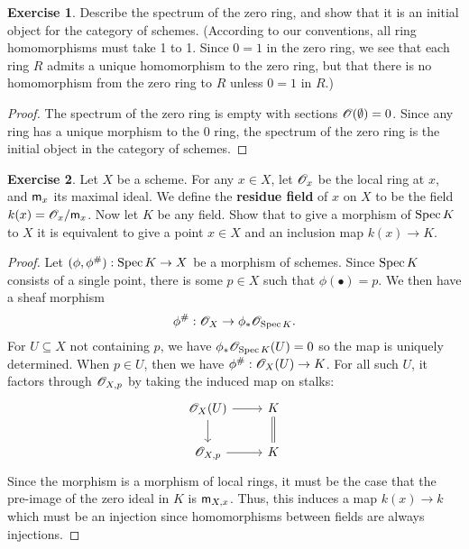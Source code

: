 \documentclass[]{pcmi}
\theoremstyle{plain}
\theoremstyle{definition}
\newtheorem{Exercise}{Exercise}
\theoremstyle{remark}
\begin{document}
\begin{Exercise}
    Describe the spectrum of the zero ring, and show that it is an initial object for the category of schemes. (According to our conventions, all ring homomorphisms must take 1 to 1. Since $0 = 1$ in the zero ring, we see that each ring $R$ admits a unique homomorphism to the zero ring, but that there is no homomorphism from the zero ring to $R$ unless $0 = 1$ in $R$.)
\end{Exercise}

\begin{proof}
    The spectrum of the zero ring is empty with sections $\mathscr{O}(\emptyset) = 0$. Since any ring has a unique morphism to the $0$ ring, the spectrum of the zero ring is the initial object in the category of schemes. 
\end{proof}

\begin{Exercise}
    Let $X$ be a scheme. For any $x \in X$, let $\mathscr{O}_x$ be the local ring at $x$, and $\mathsf{m}_x$ its maximal ideal. We define the \textbf{residue field} of $x$ on $X$ to be the field $k(x) = \mathscr{O}_x / \mathsf{m}_x$. Now let $K$ be any field. Show that to give a morphism of $\operatorname{Spec} K$ to $X$ it is equivalent to give a point $x \in X$ and an inclusion map $k(x) \to K$. 
\end{Exercise}

\begin{proof}
    Let $(\phi, \phi^{\#}): \operatorname{Spec} K \to X$ be a morphism of schemes. Since $\operatorname{Spec} K$ consists of a single point, there is some $p \in X$ such that $\phi(\bullet) = p$. We then have a sheaf morphism 
    \[
        \phi^{\#} : \mathscr{O}_X \to \phi_* \mathscr{O}_{\operatorname{Spec} K}. 
    \]
    For $U \subseteq X$ not containing $p$, we have $\phi_* \mathscr{O}_{\operatorname{Spec} K}(U) = 0$ so the map is uniquely determined. When $p \in U$, then we have $\phi^{\#} : \mathscr{O}_X(U) \to K$. For all such $U$, it factors through $\mathscr{O}_{X, p}$ by taking the induced map on stalks:
    \[
        \begin{tikzcd}
            {\mathscr{O}_X(U)} & K \\
            {\mathscr{O}_{X, p}} & K
            \arrow[from=1-1, to=1-2]
            \arrow[from=1-1, to=2-1]
            \arrow[Rightarrow, no head, from=1-2, to=2-2]
            \arrow[from=2-1, to=2-2]
        \end{tikzcd}
    \]
    Since the morphism is a morphism of local rings, it must be the case that the pre-image of the zero ideal in $K$ is $\mathsf{m}_{X, x}$. Thus, this induces a map $k(x) \to k$ which must be an injection since homomorphisms between fields are always injections.
\end{proof}
\end{document}
